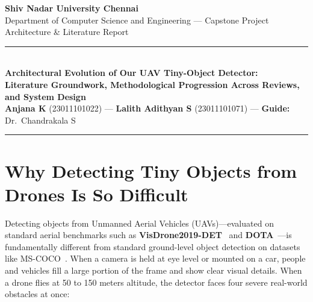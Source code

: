 \documentclass[11pt,a4paper]{article}
\begin{document}
\begin{center}
    {\large \textbf{Shiv Nadar University Chennai}}\\[2pt]
    {\small Department of Computer Science and Engineering --- Capstone Project Architecture \& Literature Report}\\[10pt]
    \rule{\textwidth}{1.2pt}\\[8pt]
    {\LARGE \textbf{Architectural Evolution of Our UAV Tiny-Object Detector:}}\\[4pt]
    {\large \textbf{Literature Groundwork, Methodological Progression Across Reviews, and System Design}}\\[8pt]
    \textbf{Anjana K} (23011101022) \quad --- \quad \textbf{Lalith Adithyan S} (23011101071) \quad --- \quad \textbf{Guide:} Dr.\ Chandrakala S\\[6pt]
    \rule{\textwidth}{0.8pt}
\end{center}

\vspace{0.3em}

\section{Why Detecting Tiny Objects from Drones Is So Difficult}

Detecting objects from Unmanned Aerial Vehicles (UAVs)---evaluated on standard aerial benchmarks such as \textbf{VisDrone2019-DET}~\cite{du2019visdrone,zhu2021visdrone} and \textbf{DOTA}~\cite{xia2018dota,ding2021dota}---is fundamentally different from standard ground-level object detection on datasets like MS-COCO~\cite{lin2017fpn,lin2017focal}. When a camera is held at eye level or mounted on a car, people and vehicles fill a large portion of the frame and show clear visual details. When a drone flies at 50 to 150 meters altitude, the detector faces four severe real-world obstacles at once:
\end{document}
